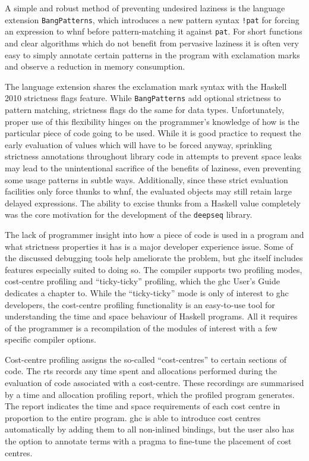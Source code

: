 \documentclass[thesis=B,english]{FITthesis}[2019/12/23]
\newcommand{\hackage}[1]{\texttt{#1}}
\newcommand{\hsPat}[1]{\texttt{#1}}
\begin{document}
A simple and robust method of preventing undesired laziness is the
language extension \texttt{BangPatterns}, which introduces a new pattern syntax
\hsPat{!pat} for forcing an expression to \acrshort{whnf} before
pattern-matching it against \hsPat{pat}. For short functions and clear
algorithms which do not benefit from pervasive laziness it is often very easy
to simply annotate certain patterns in the program with exclamation marks and
observe a reduction in memory consumption.

The language extension shares the exclamation mark syntax with the Haskell 2010
strictness flags feature\cite{haskell2010-strictness-flags}. While
\texttt{BangPatterns} add optional strictness to pattern matching, strictness
flags do the same for data types. Unfortunately, proper use of this flexibility
hinges on the programmer's knowledge of how is the particular piece of code
going to be used. While it is good practice to request the early evaluation of
values which will have to be forced anyway, sprinkling strictness annotations
throughout library code in attempts to prevent space leaks may lead to the
unintentional sacrifice of the benefits of laziness, even preventing some usage
patterns in subtle ways. Additionally, since these strict evaluation facilities
only force thunks to \acrshort{whnf}, the evaluated objects may still retain
large delayed expressions. The ability to excise thunks from a Haskell value
completely was the core motivation for the development of the \hackage{deepseq}
library.

The lack of programmer insight into how a piece of code is used in a program
and what strictness properties it has is a major developer experience
issue\cite{memory-profiling-blog-post, anatomy-of-thunk-leak-blog-post,
nothunks-blog-post, haskell-space-leaks, detecting-space-leaks-blog-post}.
Some of the discussed debugging tools help ameliorate the problem, but
\acrshort{ghc} itself includes features especially suited to doing so. The
compiler supports two profiling modes, cost-centre profiling and
``ticky-ticky'' profiling, which the \acrshort{ghc} User's Guide dedicates a
chapter to\cite{ghc-profiling}. While the ``ticky-ticky'' mode is only of
interest to \acrshort{ghc} developers, the cost-centre profiling functionality
is an easy-to-use tool for understanding the time and space behaviour of
Haskell programs. All it requires of the programmer is a recompilation of the
modules of interest with a few specific compiler options.

Cost-centre profiling assigns the so-called ``cost-centres'' to certain
sections of code. The \acrshort{rts} records any time spent and allocations
performed during the evaluation of code associated with a cost-centre. These
recordings are summarised by a time and allocation profiling report, which the
profiled program generates. The report indicates the time and space
requirements of each cost centre in proportion to the entire program.
\acrshort{ghc} is able to introduce cost centres automatically by adding them
to all non-in\-lined bindings, but the user also has the option to annotate
terms with a pragma to fine-tune the placement of cost centres.
\end{document}
